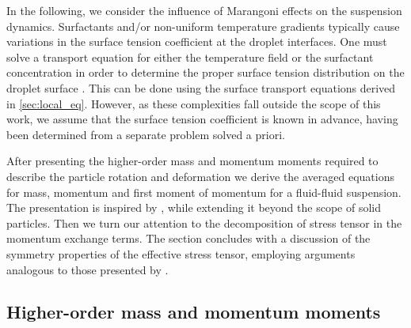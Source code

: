 In the following, we consider the influence of Marangoni effects on the suspension dynamics. Surfactants and/or non-uniform temperature gradients typically cause variations in the surface tension coefficient at the droplet interfaces. 
One must solve a transport equation for either the temperature field or the surfactant concentration in order to determine the proper surface tension distribution on the droplet surface \citep{Subramanian_1985,leal2007advanced}. 
This can be done using the surface transport equations derived in \ref{sec:local_eq}. 
However, as these complexities fall outside the scope of this work, we assume that the surface tension coefficient is known in advance, having been determined from a separate problem solved a priori.



After presenting the higher-order mass and momentum moments required to describe the particle rotation and deformation we derive the averaged equations for mass, momentum and first moment of momentum for a fluid-fluid suspension.
The presentation is inspired by \citep{lhuillier2009rheology}, while extending it beyond the scope of solid particles.
Then we turn our attention to the decomposition of stress tensor in the momentum exchange terms. 
The section concludes with a discussion of the symmetry properties of the effective stress tensor, employing arguments analogous to those presented by \citet{lhuillier1996contribution}.



\subsection{Higher-order mass and momentum moments}



